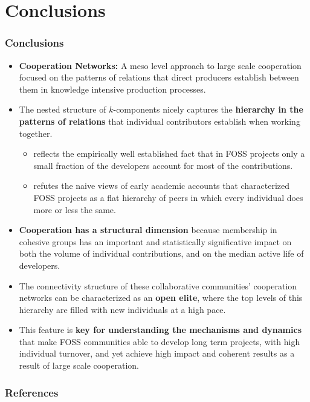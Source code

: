 \documentclass[ignorenonframetext,red,8pt,notes=hide]{beamer}
\begin{document}
\section{Conclusions}

\begin{frame}
\frametitle{Conclusions}

\begin{itemize}

\item \textbf{Cooperation Networks:} A meso level approach to large scale cooperation focused on the patterns of relations that direct producers establish between them in knowledge intensive production processes.

\item The nested structure of $k$-components nicely captures the \textbf{hierarchy in the patterns of relations} that individual contributors establish when working together.

\begin{itemize}
\item reflects the empirically well established fact that in FOSS projects only a small fraction of the developers account for most of the contributions.

\item refutes the naive views of early academic accounts that characterized FOSS projects as a flat hierarchy of peers in which every individual does more or less the same.
\end{itemize}

\item \textbf{Cooperation has a structural dimension} because membership in cohesive groups has an important and statistically significative impact on both the volume of individual contributions, and on the median active life of developers.

\item The connectivity structure of these collaborative communities' cooperation networks can be characterized as an \textbf{open elite}, where the top levels of this hierarchy are filled with new individuals at a high pace. 

\item This feature is \textbf{key for understanding the mechanisms and dynamics} that make FOSS communities able to develop long term projects, with high individual turnover, and yet achieve high impact and coherent results as a result of large scale cooperation.

\end{itemize}

\end{frame}




\begin{frame}[label=biblio]
\frametitle{References}
\begin{tiny}


\end{tiny}
\end{frame}
\end{document}
